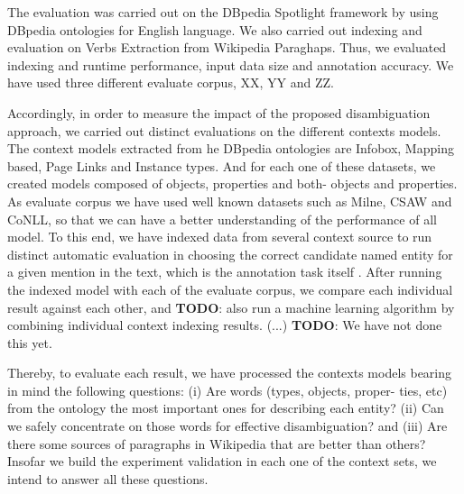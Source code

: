 \documentclass[10pt,a4paper]{article}
\newcommand{\todo}[1]{{\color{red}\textsf{\textbf{TODO}}: #1}}
\begin{document}
The evaluation was carried out on the DBpedia Spotlight framework by using DBpedia ontologies for English language. We also carried out indexing and evaluation on Verbs Extraction from Wikipedia Paraghaps. Thus, we evaluated indexing and runtime performance, input data size and annotation accuracy. We have used three different evaluate corpus, XX, YY and ZZ.

Accordingly, in order to measure the impact of the proposed disambiguation approach, we carried out distinct evaluations on the different contexts models. The context models extracted from he DBpedia ontologies are Infobox, Mapping based, Page Links and Instance types. And for each one of these datasets, we created models composed of objects, properties and both- objects and properties. As evaluate corpus we have used well known datasets such as Milne, CSAW and CoNLL, so that we can have a better understanding of the performance of all model.
To this end, we have indexed data from several context source to run distinct automatic evaluation in choosing the correct candidate named entity for a given mention in the text, which is the annotation task itself . After running the indexed model with each of the evaluate corpus, we compare each individual result against each other, and \todo{also run a machine learning algorithm by combining individual context indexing results. (...)} \todo{ We have not done this yet.}

Thereby, to evaluate each result, we have processed the contexts models bearing in mind the following questions: (i) Are words (types, objects, proper- ties, etc) from the ontology the most important ones for describing each entity? (ii) Can we safely concentrate on those words for effective disambiguation? and (iii) Are there some sources of paragraphs in Wikipedia that are better than others?
Insofar we build the experiment validation in each one of the context sets, we intend to answer all these questions.




\end{document}
